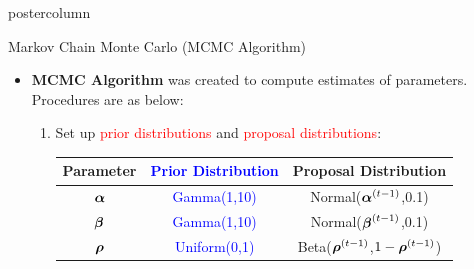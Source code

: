 \documentclass[final]{beamer}\usepackage[]{graphicx}\usepackage[]{color}
\newcommand{\balpha}{\mbox{\boldmath $\alpha$} }
\newcommand{\bbeta}{\mbox{\boldmath $\beta$} }
\newcommand{\brho}{\mbox{\boldmath $\rho$} }
\newcommand{\red}{\textcolor{red}}
\newcommand{\blue}{\textcolor{blue}}
\begin{document}
{\begin{frame}
\begin{columns}
\begin{column}{.33\textwidth}
\begin{beamercolorbox}[center,wd=\textwidth]{postercolumn}
\begin{minipage}[T]{.97\textwidth}
{\begin{block}{Markov Chain Monte Carlo (MCMC Algorithm)}
\begin{itemize}
		
		
		\item \textbf{MCMC Algorithm} was created to compute estimates of parameters.\\
		Procedures are as below:
		  \begin{enumerate}
       	\vspace{0.3cm}
    		\item Set up \red{prior distributions} and \red{proposal distributions}:
    		\vspace{0.1cm}
    		  \renewcommand\arraystretch{1.3}
          \begin{center}
          \begin{tabular}{c|cc}
          \textbf{Parameter}  & \blue{\textbf{Prior Distribution}} & \textbf{Proposal Distribution}\\ \hline
          \large{$\balpha$}    & \blue{Gamma(1,10)}   & Normal($\balpha^{(t-1)}$,0.1)  \\ %
          \large{$\bbeta$}     & \blue{Gamma(1,10)}   & Normal($\bbeta^{(t-1)}$,0.1)  \\ %
          \large{$\brho$}      & \blue{Uniform(0,1)}  & Beta($\brho^{(t-1)}$,$1-\brho^{(t-1)}$)   \\ %
          \end{tabular}  
         \end{center}
          

\end{enumerate}
\end{itemize}
\end{block}}
\end{minipage}
\end{beamercolorbox}
\end{column}
\end{columns}
\end{frame}}
\end{document}
